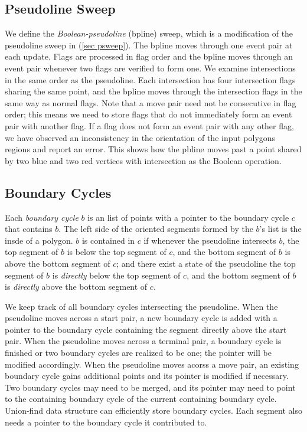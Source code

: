 \documentclass[11pt]{article}
\begin{document}
\subsection{Pseudoline Sweep} \label{sec psweep2}
We define the \textit{Boolean-pseudoline} (bpline) sweep, which is a modification of the pseudoline sweep in (\ref{sec psweep}).
The bpline moves through one event pair at each update.
Flags are processed in flag order and the bpline moves through an event pair whenever two flags are verified to form one.
We examine intersections in the same order as the pseudoline.
Each intersection has four intersection flags sharing the same point, and the bpline moves through the intersection flags in the same way as normal flags.
Note that a move pair need not be consecutive in flag order; this means we need to store flags that do not immediately form an event pair with another flag.
If a flag does not form an event pair with any other flag, we have observed an inconsistency in the orientation of the input polygons regions and report an error.
This shows how the pbline moves past a point shared by two blue and two red vertices with intersection as the Boolean operation.

\subsection{Boundary Cycles} \label{sec bcycle}
Each \textit{boundary cycle} $b$ is an list of points with a pointer to the boundary cycle $c$ that contains $b$.
The left side of the oriented segments formed by the $b$'s list is the insde of a polygon.
$b$ is contained in $c$ if whenever the pseudoline intersects $b$, the top segment of $b$ is below the top segment of $c$, and the bottom segment of $b$ is above the bottom segment of $c$; and there exist a state of the pseudoline the top segment of $b$ is \textit{directly} below the top segment of $c$, and the bottom segment of $b$ is \textit{directly} above the bottom segment of $c$.

We keep track of all boundary cycles intersecting the pseudoline.
When the pseudoline moves across a start pair, a new boundary cycle is added with a pointer to the boundary cycle containing the segment directly above the start pair.
When the pseudoline moves across a terminal pair, a boundary cycle is finished or two boundary cycles are realized to be one; the pointer will be modified accordingly.
When the pseudoline moves acorss a move pair, an existing boundary cycle gains additional points and its pointer is modified if necessary.
Two boundary cycles may need to be merged, and its pointer may need to point to the containing boundary cycle of the current containing boundary cycle.
Union-find data structure can efficiently store boundary cycles.
Each segment also needs a pointer to the boundary cycle it contributed to.
\end{document}
